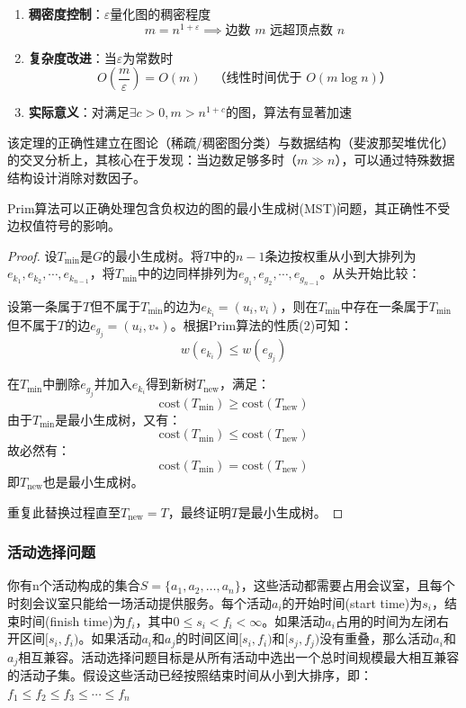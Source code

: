 \documentclass[./../main.tex]{subfiles}
\begin{document}
\begin{enumerate}
    \item \textbf{稠密度控制}：$\varepsilon$量化图的稠密程度
    $$
    m=n^{1+\varepsilon} \implies \text{边数 } m \text{ 远超顶点数 } n
    $$
    
    \item \textbf{复杂度改进}：当$\varepsilon$为常数时
    $$
    O\left(\frac{m}{\varepsilon}\right) = O(m) \quad \text{（线性时间优于 } O(m\log n)\text{）}
    $$
    
    \item \textbf{实际意义}：对满足$\exists c>0, m>n^{1+c}$的图，算法有显著加速
\end{enumerate}
该定理的正确性建立在图论（稀疏/稠密图分类）与数据结构（斐波那契堆优化）的交叉分析上，其核心在于发现：当边数足够多时（$m\gg n$），可以通过特殊数据结构设计消除对数因子。

Prim算法可以正确处理包含负权边的图的最小生成树(MST)问题，其正确性不受边权值符号的影响。

\begin{proof}
设$T_{\min}$是$G$的最小生成树。将$T$中的$n-1$条边按权重从小到大排列为$e_{k_1},e_{k_2},\cdots,e_{k_{n-1}}$，将$T_{\min}$中的边同样排列为$e_{g_1},e_{g_2},\cdots,e_{g_{n-1}}$。从头开始比较：

设第一条属于$T$但不属于$T_{\min}$的边为$e_{k_i}=(u_i,v_i)$，则在$T_{\min}$中存在一条属于$T_{\min}$但不属于$T$的边$e_{g_j}=(u_i,v_*)$。根据Prim算法的性质(2)可知：
$$ w(e_{k_i}) \leq w(e_{g_j}) $$

在$T_{\min}$中删除$e_{g_j}$并加入$e_{k_i}$得到新树$T_{\text{new}}$，满足：
$$ \text{cost}(T_{\min}) \geq \text{cost}(T_{\text{new}}) $$
由于$T_{\min}$是最小生成树，又有：
$$ \text{cost}(T_{\min}) \leq \text{cost}(T_{\text{new}}) $$
故必然有：
$$ \text{cost}(T_{\min}) = \text{cost}(T_{\text{new}}) $$
即$T_{\text{new}}$也是最小生成树。

重复此替换过程直至$T_{\text{new}}=T$，最终证明$T$是最小生成树。
\end{proof}

\subsubsection{活动选择问题}
你有n个活动构成的集合$S=\{a_{1},a_{2},\ldots,a_{n}\}$，这些活动都需要占用会议室，且每个时刻会议室只能给一场活动提供服务。每个活动$a_{i}$的开始时间(start time)为$s_{i}$，结束时间(finish time)为$f_{i}$，其中$0\leq s_{i}<f_{i}<\infty$。如果活动$a_{i}$占用的时间为左闭右开区间$[s_{i},f_{i})$。如果活动$a_{i}$和$a_{j}$的时间区间$[s_{i},f_{i})$和$[s_{j},f_{j})$没有重叠，那么活动$a_{i}$和$a_{j}$相互兼容。活动选择问题目标是从所有活动中选出一个总时间规模最大相互兼容的活动子集。假设这些活动已经按照结束时间从小到大排序，即：$f_{1}\leq f_{2}\leq f_{3}\leq\cdots\leq f_{n}$
\end{document}
